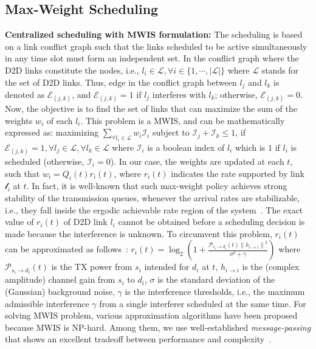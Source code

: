\documentclass[journal]{IEEEtran}
\begin{document}
 \vspace{-1.0mm}

\subsection{Max-Weight Scheduling}

\textbf{Centralized scheduling with MWIS formulation:}
The scheduling is based on a link conflict graph such that the links scheduled to be active simultaneously in any time slot must form an independent set. In the conflict graph where the D2D links constitute the nodes, i.e., $l_{i}\in\mathcal{L}, \forall i\in\{1,\cdots,|\mathcal{L}|\}$ where $\mathcal{L}$ stands for the set of D2D links.
Thus, edge in the conflict graph between $l_{j}$ and $l_{k}$ is denoted as $\mathcal{E}_{(j,k)}$, and $\mathcal{E}_{(j,k)}=1$ if $l_{j}$ interferes with $l_{k}$; otherwise, $\mathcal{E}_{(j,k)}=0$.
Now, the objective is to find the set of links that can maximize the sum of the weights $w_{i}$ of each $l_{i}$.
This problem is a MWIS, and can be mathematically expressed as: maximizing $\sum_{\forall l_{i}\in\mathcal{L}}\nolimits w_{i}\mathcal{I}_{i}$ subject to $\mathcal{I}_{j} + \mathcal{I}_{k} \leq 1$, if $\mathcal{E}_{(j,k)}=1, \forall l_{j}\in\mathcal{L}, \forall l_{k}\in\mathcal{L}$
where $\mathcal{I}_{i}$ is a boolean index of $l_{i}$ which is $1$ if $l_{i}$ is scheduled (otherwise, $\mathcal{I}_{i}=0$). In our case, the weights are updated at each $t$, such that $w_{i} = Q_{i}(t) r_{i}(t)$, where $r_{i}(t)$ indicates the rate supported by link $\mathcal{l}_{i}$
at $t$. In fact, it is well-known that such max-weight policy achieves strong stability of the transmission queues, whenever the arrival rates are stabilizable, i.e., they fall inside the ergodic achievable rate region of the system~\cite{asilomar2012bethanabhotla}.
The exact value of $r_{i}(t)$ of D2D link $l_{i}$ cannot be obtained before a scheduling decision is made because the interference is unknown.
To circumvent this problem, $r_{i}(t)$ can be approximated as follows~\cite{jsac2011win}:
$r_{i}(t) = \log_{2}
\left(
    1+
    \frac{
        \mathcal{P}_{s_{i}\rightarrow d_{i}}(t)\left\|h_{i\rightarrow i}\right\|^{2}
    }{\sigma^{2} + \gamma}
\right)$
where
    $\mathcal{P}_{s_{i}\rightarrow d_{i}}(t)$ is the TX power from $s_{i}$ intended for $d_{i}$ at $t$,
    $h_{i\rightarrow i}$ is the (complex amplitude) channel gain from $s_{i}$ to $d_{i}$,
    $\sigma$ is the standard deviation of the (Gaussian) background noise,
    $\gamma$ is the interference thresholds, i.e., the maximum admissible interference $\gamma$ from a single interferer scheduled at the same time.
For solving MWIS problem, various approximation algorithms have been proposed because MWIS is NP-hard. Among them, we use well-established \textit{message-passing} that shows an excellent tradeoff between performance and complexity~\cite{tit2009sanghavi}.
\end{document}
